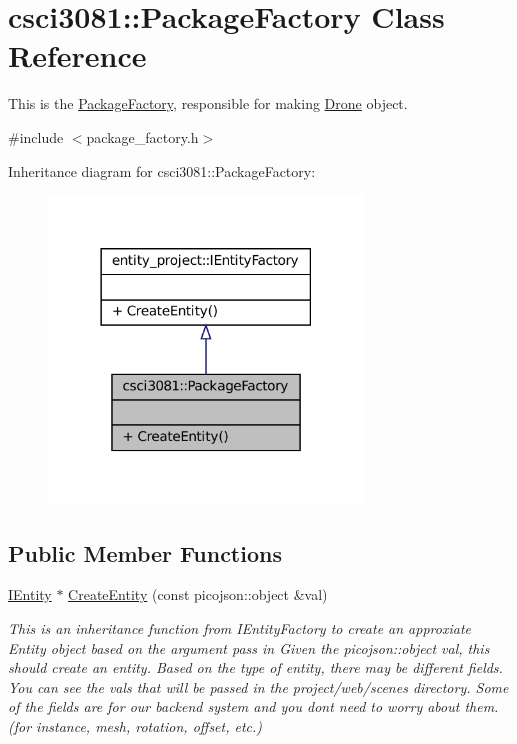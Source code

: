 \hypertarget{classcsci3081_1_1PackageFactory}{}\section{csci3081\+:\+:Package\+Factory Class Reference}
\label{classcsci3081_1_1PackageFactory}


This is the \hyperlink{classcsci3081_1_1PackageFactory}{Package\+Factory}, responsible for making \hyperlink{classcsci3081_1_1Drone}{Drone} object.  




{\ttfamily \#include $<$package\+\_\+factory.\+h$>$}



Inheritance diagram for csci3081\+:\+:Package\+Factory\+:
\nopagebreak
\begin{figure}[H]
\begin{center}
\leavevmode
\includegraphics[width=237pt]{classcsci3081_1_1PackageFactory__inherit__graph}
\end{center}
\end{figure}
\subsection*{Public Member Functions}
\begin{DoxyCompactItemize}
\item 
\hyperlink{classentity__project_1_1IEntity}{I\+Entity} $\ast$ \hyperlink{classcsci3081_1_1PackageFactory_ac95467baa4ab68a96ce114548e0b5089}{Create\+Entity} (const picojson\+::object \&val)
\begin{DoxyCompactList}\small\item\em This is an inheritance function from I\+Entity\+Factory to create an approxiate Entity object based on the argument pass in Given the picojson\+::object val, this should create an entity. Based on the type of entity, there may be different fields. You can see the vals that will be passed in the project/web/scenes directory. Some of the fields are for our backend system and you don\textquotesingle{}t need to worry about them. (for instance, mesh, rotation, offset, etc.) \end{DoxyCompactList}\end{DoxyCompactItemize}


